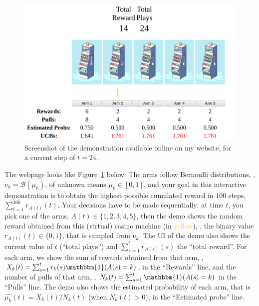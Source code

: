 \begin{figure}[h!]  %
    \centering
    \includegraphics[width=0.85\linewidth]{2-Chapters/2-Chapter/Images/example_of_a_5_arm_bandit_problem.png}
    \caption{Screenshot of the demonstration available online on my website, for a current step of $t=24$.}
    \label{fig:2:example_of_a_5_arm_bandit_problem}
\end{figure}


The webpage looks like Figure~\ref{fig:2:example_of_a_5_arm_bandit_problem} below.
The arms follow Bernoulli distributions, \ie, $\nu_k = \mathcal{B}(\mu_k)$, of unknown means $\mu_k\in[0,1]$, and your goal in this interactive demonstration is to obtain the highest possible cumulated reward in $100$ steps, $\sum_{t=1}^{100} r_{A(t)}(t)$.
Your decisions have to be made sequentially: at time $t$, you pick one of the arms, $A(t) \in\{1,2,3,4,5\}$, then the demo shows the random reward obtained from this (virtual) casino machine (in \textcolor{gold}{yellow}), \ie, the binary value $r_{A(t)}(t)\in\{0,1\}$, that is sampled \iid{} from $\nu_k$.
%
The UI of the demo also shows the current value of $t$ (``total plays'') and $\sum_{s=1}^t r_{A(s)}(s)$ the ``total reward''.
For each arm, we show the sum of rewards obtained from that arm, \ie, $X_k(t) = \sum_{s=1}^t r_k(s) \mathbbm{1}(A(s) = k)$, in the ``Rewards'' line, and the number of pulls of that arm, \ie, $N_k(t) = \sum_{s=1}^t \mathbbm{1}(A(s) = k)$ in the ``Pulls'' line.
%
The demo also shows the estimated probability of each arm, that is $\widehat{\mu_k}(t) = X_k(t) / N_k(t)$ (when $N_k(t)>0$), in the ``Estimated probs'' line.

